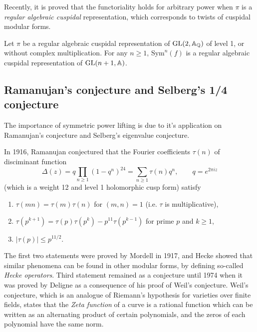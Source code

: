 Recently, it is proved that the functoriality holds for arbitrary power when $\pi$ is a \emph{regular algebraic cuspidal} representation, which corresponds to twists of cuspidal modular forms.
\begin{theorem}
Let $\pi$ be a regular algebraic cuspidal representation of $\operatorname{\mathrm{GL}}(2, \mathbb{A}_{\mathbb{Q}})$ of level 1, or without complex multiplication.
For any $n\geq 1$, $\mathrm{Sym}^{n}(f)$ is a regular algebraic cuspidal representation of $\operatorname{\mathrm{GL}}(n + 1, \mathbb{A})$.
\end{theorem}


\subsection{Ramanujan's conjecture and Selberg's 1/4 conjecture}

The importance of symmetric power lifting is due to it's application on Ramanujan's conjecture and Selberg's eigenvalue conjecture.

In 1916, Ramanujan conjectured that the Fourier coefficients $\tau(n)$ of disciminant function
$$
\Delta(z) = q\prod_{n\geq 1}(1 - q^{n})^{24} = \sum_{n\geq 1}\tau(n)q^{n}, \qquad q = e^{2\pi i z}
$$
(which is a weight 12 and level 1 holomorphic cusp form) satisfy
\begin{enumerate}
    \item $\tau(mn) = \tau(m)\tau(n)$ for $(m, n) =1$ (i.e. $\tau$ is multiplicative),
    \item $\tau(p^{k+1}) = \tau(p)\tau(p^{k}) - p^{11}\tau(p^{k-1})$ for prime $p$ and $k\geq 1$,
    \item $|\tau(p)|\leq p^{11/2}$.
\end{enumerate}
The first two statements were proved by Mordell in 1917, and Hecke showed that 
similar phenomena can be found in other modular forms, by defining so-called \emph{Hecke operators}.
Third statement remained as a conjecture until 1974 when it was proved by Deligne
as a consequence of his proof of Weil's conjecture.
Weil's conjecture, which is an analogue of Riemann's hypothesis for varieties over finite fields,
states that the \emph{Zeta function} of a curve is a rational function which can be written as
an alternating product of certain polynomials, and the zeros of each polynomial have the same norm.

